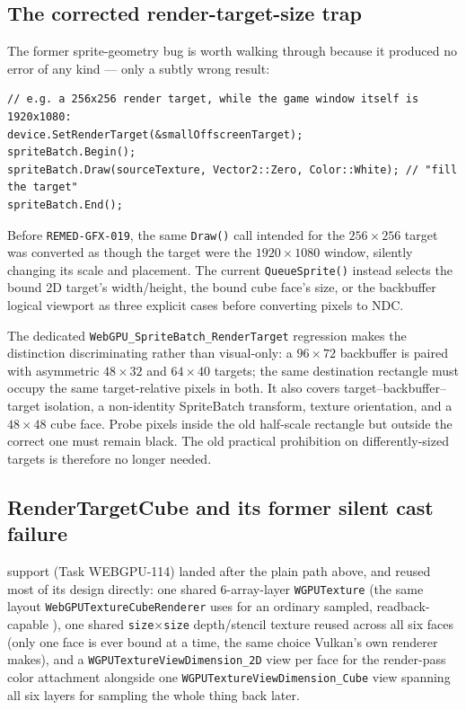 \subsection{The corrected render-target-size trap}

The former sprite-geometry bug is worth walking through because it produced no error of any
kind --- only a subtly wrong result:

\begin{lstlisting}
// e.g. a 256x256 render target, while the game window itself is 1920x1080:
device.SetRenderTarget(&smallOffscreenTarget);
spriteBatch.Begin();
spriteBatch.Draw(sourceTexture, Vector2::Zero, Color::White); // "fill the target"
spriteBatch.End();
\end{lstlisting}

Before \texttt{REMED-GFX-019}, the same \texttt{Draw()} call intended for the
$256\times256$ target was converted as though the target were the $1920\times1080$ window,
silently changing its scale and placement. The current \texttt{QueueSprite()} instead selects
the bound 2D target's width/height, the bound cube face's size, or the backbuffer logical
viewport as three explicit cases before converting pixels to NDC.

The dedicated \texttt{WebGPU\_SpriteBatch\_RenderTarget} regression makes the distinction
discriminating rather than visual-only: a $96\times72$ backbuffer is paired with asymmetric
$48\times32$ and $64\times40$ targets; the same destination rectangle must occupy the same
target-relative pixels in both. It also covers target--backbuffer--target isolation, a
non-identity SpriteBatch transform, texture orientation, and a $48\times48$ cube face. Probe
pixels inside the old half-scale rectangle but outside the correct one must remain black. The
old practical prohibition on differently-sized targets is therefore no longer needed.

\subsection{RenderTargetCube and its former silent cast failure}

 support (Task WEBGPU-114) landed after the plain
 path above, and reused most of its design directly: one shared
6-array-layer \texttt{WGPUTexture} (the same layout \texttt{WebGPUTextureCubeRenderer} uses
for an ordinary sampled, readback-capable ), one shared
\texttt{size}$\times$\texttt{size}
depth/stencil texture reused across all six faces (only one face is ever bound at a time, the
same choice Vulkan's own  renderer makes), and a
\texttt{WGPUTextureViewDimension\_2D} view per face for the render-pass color attachment
alongside one \texttt{WGPUTextureViewDimension\_Cube} view spanning all six layers for sampling
the whole thing back later.

